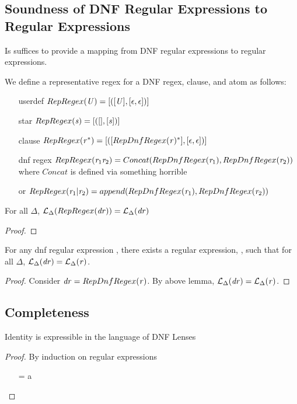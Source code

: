 \subsection{Soundness of DNF Regular Expressions to Regular Expressions}
Is suffices to provide a mapping from DNF regular expressions to regular
expressions.
\begin{definition}[RepRegex]
We define a representative regex for a DNF regex, clause, and atom as follows:
\begin{itemize}
\item[userdef] $RepRegex(\mathit{U})=[([\mathit{U}],[\epsilon,\epsilon])]$
\item[star] $RepRegex(\mathit{s})=[([],[\mathit{s}])]$
\item[clause] $RepRegex(\mathit{r}^*) = [([RepDnfRegex(\mathit{r})^*],[\epsilon,\epsilon])]$
\item[dnf regex] $RepRegex(\mathit{r}_1\mathit{r}_2) = Concat(RepDnfRegex(\mathit{r}_1),RepDnfRegex(\mathit{r}_2))$ where $Concat$ is defined via something horrible
\item[or] $RepRegex(\mathit{r}_1|\mathit{r}_2) = append(RepDnfRegex(\mathit{r}_1),RepDnfRegex(\mathit{r}_2))$
\end{itemize}
\end{definition}

\begin{lemma}
For all $\Delta$, $\mathcal{L}_{\Delta}(RepRegex(\mathit{dr})) = \mathcal{L}_{\Delta}(\mathit{dr})$
\begin{proof}
\end{proof}
\end{lemma}

\begin{theorem}
For any dnf regular expression \DNFRegex{}, there exists a regular expression, \DNFRegex{},
such that for all $\Delta$, $\mathcal{L}_{\Delta}(\mathit{dr}) = \mathcal{L}_{\Delta}(\mathit{r})$.
\begin{proof}
Consider $\mathit{dr}=RepDnfRegex(\mathit{r})$.  By above lemma, $\mathcal{L}_{\Delta}(\mathit{dr})=\mathcal{L}_{\Delta}(\mathit{r})$.
\end{proof}
\end{theorem}

\subsection{Completeness}
\begin{lemma}
Identity is expressible in the language of DNF Lenses
\begin{proof}
By induction on regular expressions
\begin{enumerate}
\item[\Regex=\RegexVariable] a
\end{enumerate}
\end{proof}
\end{lemma}

